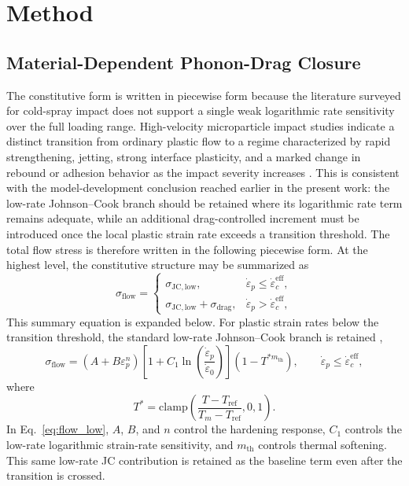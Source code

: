 \section{Method}

\subsection{Material-Dependent Phonon-Drag Closure}
The constitutive form is written in piecewise form because the literature surveyed for cold-spray impact does not support a single weak logarithmic rate sensitivity over the full loading range. High-velocity microparticle impact studies indicate a distinct transition from ordinary plastic flow to a regime characterized by rapid strengthening, jetting, strong interface plasticity, and a marked change in rebound or adhesion behavior as the impact severity increases \cite{Hassani2019,Tiamiyu2021,Zhang2025Peridynamics,Chen2026Indentation}. This is consistent with the model-development conclusion reached earlier in the present work: the low-rate Johnson--Cook branch should be retained where its logarithmic rate term remains adequate, while an additional drag-controlled increment must be introduced once the local plastic strain rate exceeds a transition threshold. The total flow stress is therefore written in the following piecewise form. At the highest level, the constitutive structure may be summarized as
\begin{equation}
\sigma_{\mathrm{flow}}=
\begin{cases}
\sigma_{\mathrm{JC,low}}, & \dot{\varepsilon}_p \le \dot{\varepsilon}^{\mathrm{eff}}_c,\\[0.4em]
\sigma_{\mathrm{JC,low}}+\sigma_{\mathrm{drag}}, & \dot{\varepsilon}_p > \dot{\varepsilon}^{\mathrm{eff}}_c,
\end{cases}
\label{eq:flow_piecewise_overview}
\end{equation}
This summary equation is expanded below. For plastic strain rates below the transition threshold, the standard low-rate Johnson--Cook branch is retained \cite{JohnsonCook1983},
\begin{equation}
\sigma_{\mathrm{flow}}=
\left(A+B\varepsilon_p^n\right)
\left[1+C_1\ln\left(\frac{\dot{\varepsilon}_p}{\dot{\varepsilon}_0}\right)\right]
\left(1-T^{*m_{\mathrm{th}}}\right),
\qquad \dot{\varepsilon}_p \le \dot{\varepsilon}^{\mathrm{eff}}_c,
\label{eq:flow_low}
\end{equation}
where
\begin{equation}
T^*=\mathrm{clamp}\left(\frac{T-T_{\mathrm{ref}}}{T_m-T_{\mathrm{ref}}},0,1\right).
\label{eq:Tstar}
\end{equation}
In Eq.~\eqref{eq:flow_low}, $A$, $B$, and $n$ control the hardening response, $C_1$ controls the low-rate logarithmic strain-rate sensitivity, and $m_{\mathrm{th}}$ controls thermal softening. This same low-rate JC contribution is retained as the baseline term even after the transition is crossed.

